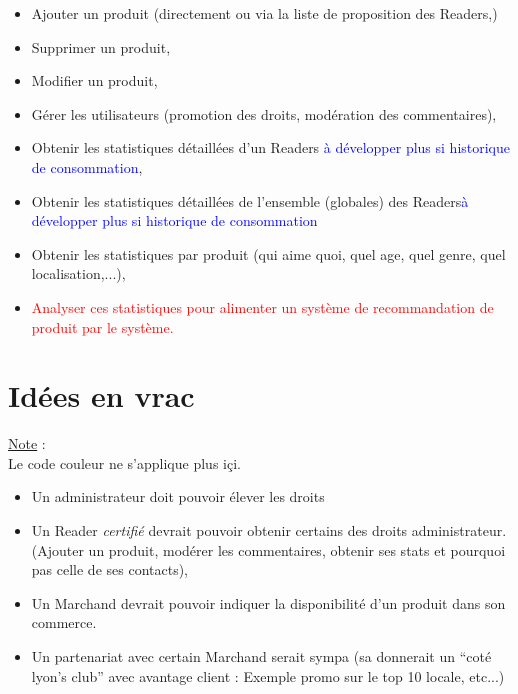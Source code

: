 \documentclass[a4paper,12pt,twoside]{article}
\newcommand{\note}[1]{\noindent\underline{Note} : \\ \indent #1}
\begin{document}
\begin{itemize}
 \item Ajouter un produit (directement ou via la liste de proposition des Readers,)
 \item Supprimer un produit, 
 \item Modifier un produit, 
 \item Gérer les utilisateurs (promotion des droits, modération des commentaires),
 \item Obtenir les statistiques détaillées d'un Readers \textcolor{blue}{à développer plus si historique de consommation},
 \item Obtenir les statistiques détaillées de l'ensemble (globales) des Readers\textcolor{blue}{à développer plus si historique de consommation}
 \item Obtenir les statistiques par produit (qui aime quoi, quel age, quel genre, quel localisation,...),
 \item \textcolor{red}{Analyser ces statistiques pour alimenter un système de recommandation de produit par le système.}
\end{itemize}
 
\section{Idées en vrac}
\note{Le code couleur ne s'applique plus içi}. \\

\begin{itemize}
 \item Un administrateur doit pouvoir élever les droits
 \item Un Reader \textit{certifié} devrait pouvoir obtenir certains des droits administrateur. (Ajouter un produit, modérer les commentaires, obtenir ses stats et pourquoi pas celle de ses contacts),
 \item Un Marchand devrait pouvoir indiquer la disponibilité d'un produit dans son commerce. 
 \item Un partenariat avec certain Marchand serait sympa (sa donnerait un ``coté lyon's club'' avec avantage client : Exemple promo sur le top 10 locale, etc...)
\end{itemize}


\end{document}
